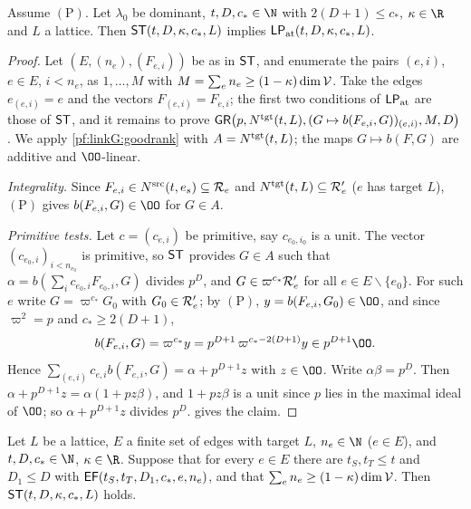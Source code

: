 \begin{lemma}\label{pf:linkG:s7}
Assume $(\mathrm P)$. Let $\lambda_0$ be dominant, $t,D,c_*\in\N$ with $2(D+1)\le c_*$, $\kappa\in\R$ and $L$
a lattice. Then $\mathsf{ST}(t,D,\kappa,c_*,L)$ implies $\mathsf{LP}_{\mathrm{at}}(t,D,\kappa,c_*,L)$.
\end{lemma}

\begin{proof}
Let $(E,(n_e),(F_{e,i}))$ be as in $\mathsf{ST}$, and enumerate the pairs $(e,i)$, $e\in E$, $i<n_e$, as $1,\dots,M$
with $M=\sum_en_e\ge(1-\kappa)\dim\mathcal V$. Take the edges $e_{(e,i)}=e$ and the vectors $F_{(e,i)}=F_{e,i}$; the first
two conditions of $\mathsf{LP}_{\mathrm{at}}$ are those of $\mathsf{ST}$, and it remains to prove
$\mathsf{GR}\bigl(p,N^{\mathrm{tgt}}(t,L),(G\mapsto b(F_{e,i},G))_{(e,i)},M,D\bigr)$. We apply \cref{pf:linkG:goodrank} with
$A=N^{\mathrm{tgt}}(t,L)$; the maps $G\mapsto b(F,G)$ are additive and $\OO$-linear.

\emph{Integrality.} Since $F_{e,i}\in N^{\mathrm{src}}(t,e_s)\subseteq\mathcal R_e$ and $N^{\mathrm{tgt}}(t,L)\subseteq\mathcal R'_e$ ($e$ has
target $L$), $(\mathrm P)$ gives $b(F_{e,i},G)\in\OO$ for $G\in A$.

\emph{Primitive tests.} Let $c=(c_{e,i})$ be primitive, say $c_{e_0,i_0}$ is a unit. The vector
$(c_{e_0,i})_{i<n_{e_0}}$ is primitive, so $\mathsf{ST}$ provides $G\in A$ such that $\alpha=b(\sum_ic_{e_0,i}F_{e_0,i},G)$
divides $p^D$, and $G\in\varpi^{c_*}\mathcal R'_{e}$ for all $e\in E\smallsetminus\{e_0\}$. For such $e$ write
$G=\varpi^{c_*}G_0$ with $G_0\in\mathcal R'_e$; by $(\mathrm P)$, $y=b(F_{e,i},G_0)\in\OO$, and since $\varpi^2=p$
and $c_*\ge2(D+1)$,
\[
b(F_{e,i},G)=\varpi^{c_*}y=p^{D+1}\,\varpi^{c_*-2(D+1)}y\in p^{D+1}\OO .
\]
Hence $\sum_{(e,i)}c_{e,i}b(F_{e,i},G)=\alpha+p^{D+1}z$ with $z\in\OO$. Write $\alpha\beta=p^D$. Then
$\alpha+p^{D+1}z=\alpha(1+pz\beta)$, and $1+pz\beta$ is a unit since $p$ lies in the maximal ideal of $\OO$; so
$\alpha+p^{D+1}z$ divides $p^D$.  gives the claim.
\end{proof}

\begin{lemma}\label{pf:linkG:asm}
Let $L$ be a lattice, $E$ a finite set of edges with target $L$, $n_e\in\N$ ($e\in E$), and $t,D,c_*\in\N$,
$\kappa\in\R$. Suppose that for every $e\in E$ there are $t_S,t_T\le t$ and $D_1\le D$ with
$\mathsf{EF}(t_S,t_T,D_1,c_*,e,n_e)$, and that $\sum_en_e\ge(1-\kappa)\dim\mathcal V$. Then
$\mathsf{ST}(t,D,\kappa,c_*,L)$ holds.
\end{lemma}

